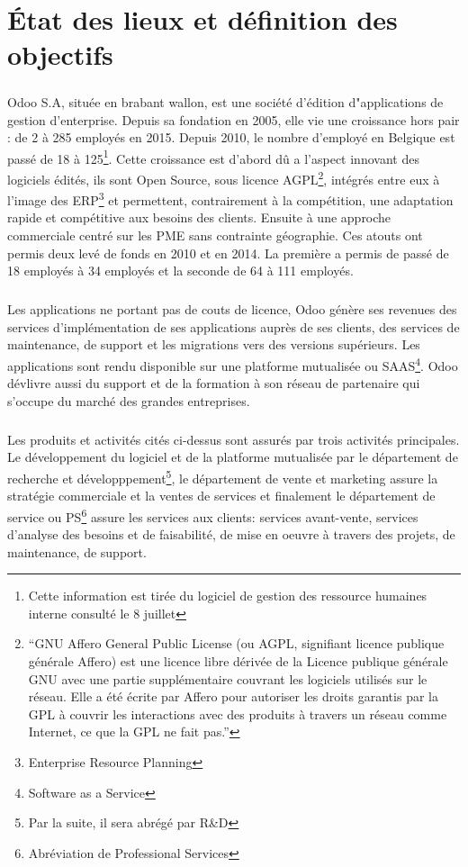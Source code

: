 \chapter{État des lieux et définition des objectifs}
\paragraph{}Odoo S.A, située en brabant wallon, est une société d’édition d"applications de gestion d'enterprise. Depuis sa fondation en 2005, elle vie une croissance hors pair : de 2  à 285 employés en 2015. Depuis 2010, le nombre d'employé en Belgique est passé de 18 à 125\footnote{Cette information est tirée du logiciel de gestion des ressource humaines interne consulté le 8 juillet}. Cette croissance est d'abord dû a l’aspect innovant des logiciels édités, ils sont Open Source, sous licence AGPL\footnote{\enquote{GNU Affero General Public License (ou AGPL, signifiant licence publique générale Affero) est une licence libre dérivée de la Licence publique générale GNU avec une partie supplémentaire couvrant les logiciels utilisés sur le réseau. Elle a été écrite par Affero pour autoriser les droits garantis par la GPL à couvrir les interactions avec des produits à travers un réseau comme Internet, ce que la GPL ne fait pas.}\cite{agpl}}, intégrés entre eux à l'image des ERP\footnote{Enterprise Resource Planning\cite{wikierp}} et permettent, contrairement à la compétition, une adaptation rapide et compétitive aux besoins des clients. Ensuite à une approche commerciale centré sur les PME sans contrainte géographie. Ces atouts ont permis deux levé de fonds en 2010 et en 2014. La première a permis de passé de 18 employés à 34 employés et la seconde de 64 à 111 employés.  

\paragraph{}Les applications ne portant pas de couts de licence, Odoo génère ses revenues des services d’implémentation de ses applications auprès de ses clients, des services de maintenance, de support et les migrations vers des versions supérieurs. Les applications sont rendu disponible sur une platforme mutualisée ou SAAS\footnote{Software as a Service}. Odoo dévlivre aussi du support et de la formation à son réseau de partenaire qui s'occupe du marché des grandes entreprises. 


\paragraph{}Les produits et activités cités ci-dessus sont assurés par trois activités principales. Le développement du logiciel et de la platforme mutualisée par le département de recherche et développpement\footnote{Par la suite, il sera abrégé par R\&D}, le département de vente et marketing assure la stratégie commerciale et la ventes de services et finalement le département de service  ou PS\footnote{Abréviation de Professional Services} assure les services aux clients: services avant-vente, services d’analyse des besoins et de faisabilité, de mise en oeuvre à travers des projets, de maintenance, de support. 

